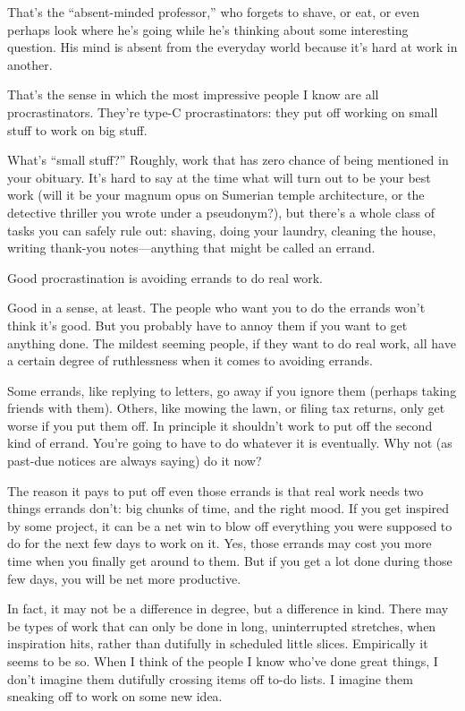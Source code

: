 \documentclass[12pt]{book}
\begin{document}
That's the ``absent-minded professor,'' who forgets to shave, or eat, or
even perhaps look where he's going while he's thinking about some
interesting question. His mind is absent from the everyday world because
it's hard at work in another.

That's the sense in which the most impressive people I know are all
procrastinators. They're type-C procrastinators: they put off working on
small stuff to work on big stuff.

What's ``small stuff?'' Roughly, work that has zero chance of being
mentioned in your obituary. It's hard to say at the time what will turn
out to be your best work (will it be your magnum opus on Sumerian temple
architecture, or the detective thriller you wrote under a pseudonym?),
but there's a whole class of tasks you can safely rule out: shaving,
doing your laundry, cleaning the house, writing thank-you
notes---anything that might be called an errand.

Good procrastination is avoiding errands to do real work.

Good in a sense, at least. The people who want you to do the errands
won't think it's good. But you probably have to annoy them if you want
to get anything done. The mildest seeming people, if they want to do
real work, all have a certain degree of ruthlessness when it comes to
avoiding errands.

Some errands, like replying to letters, go away if you ignore them
(perhaps taking friends with them). Others, like mowing the lawn, or
filing tax returns, only get worse if you put them off. In principle it
shouldn't work to put off the second kind of errand. You're going to
have to do whatever it is eventually. Why not (as past-due notices are
always saying) do it now?

The reason it pays to put off even those errands is that real work needs
two things errands don't: big chunks of time, and the right mood. If you
get inspired by some project, it can be a net win to blow off everything
you were supposed to do for the next few days to work on it. Yes, those
errands may cost you more time when you finally get around to them. But
if you get a lot done during those few days, you will be net more
productive.

In fact, it may not be a difference in degree, but a difference in kind.
There may be types of work that can only be done in long, uninterrupted
stretches, when inspiration hits, rather than dutifully in scheduled
little slices. Empirically it seems to be so. When I think of the people
I know who've done great things, I don't imagine them dutifully crossing
items off to-do lists. I imagine them sneaking off to work on some new
idea.
\end{document}
